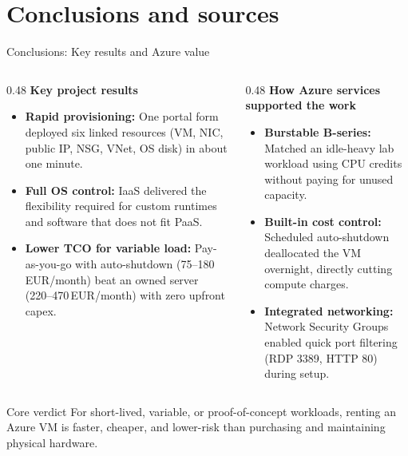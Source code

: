 \documentclass[aspectratio=169,xcolor=dvipsnames]{beamer}
\begin{document}
	\section{Conclusions and sources}
	\begin{frame}{Conclusions: Key results and Azure value}
		\begin{columns}[T]
			\begin{column}{0.48\textwidth}
				\textbf{\large Key project results}
				\begin{itemize}
					\setlength{\itemsep}{0.5em}
					\item \textbf{Rapid provisioning:} One portal form deployed six linked resources (VM, NIC, public IP, NSG, VNet, OS disk) in about one minute.
					\item \textbf{Full OS control:} IaaS delivered the flexibility required for custom runtimes and software that does not fit PaaS.
					\item \textbf{Lower TCO for variable load:} Pay-as-you-go with auto-shutdown (75--180\,EUR/month) beat an owned server (220--470\,EUR/month) with zero upfront capex.
				\end{itemize}
			\end{column}
			
			\begin{column}{0.48\textwidth}
				\textbf{\large How Azure services supported the work}
				\begin{itemize}
					\setlength{\itemsep}{0.5em}
					\item \textbf{Burstable B-series:} Matched an idle-heavy lab workload using CPU credits without paying for unused capacity.
					\item \textbf{Built-in cost control:} Scheduled auto-shutdown deallocated the VM overnight, directly cutting compute charges.
					\item \textbf{Integrated networking:} Network Security Groups enabled quick port filtering (RDP 3389, HTTP 80) during setup.
				\end{itemize}
			\end{column}
		\end{columns}
		
		\vspace{0.25cm}
		\begin{block}{Core verdict}
			For short-lived, variable, or proof-of-concept workloads, renting an Azure VM is faster, cheaper, and lower-risk than purchasing and maintaining physical hardware.
		\end{block}
	\end{frame}
	
\end{document}
